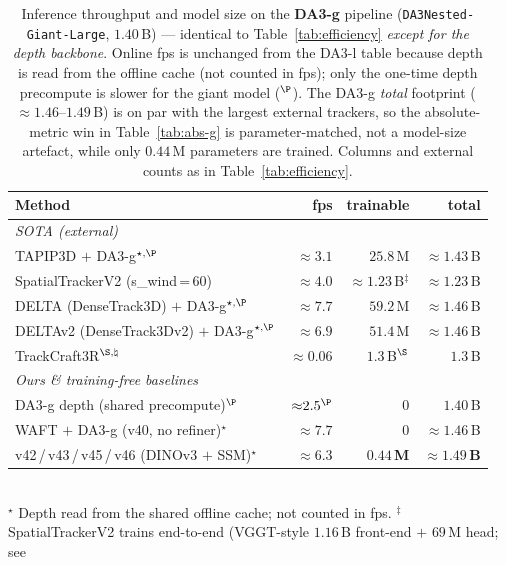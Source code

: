 \documentclass[11pt,a4paper]{article}
\begin{document}
\begin{table}[h]
\centering
\caption{Inference throughput and model size on the \textbf{DA3-g} pipeline
         (\texttt{DA3Nested-Giant-Large}, $1.40$\,B) --- identical to Table~\ref{tab:efficiency} \emph{except
         for the depth backbone}. Online fps is unchanged from the DA3-l table because depth is read from the
         offline cache (not counted in fps); only the one-time depth precompute is slower for the giant model
         ($^{\P}$). The DA3-g \emph{total} footprint (${\approx}1.46$--$1.49$\,B) is on par with the largest
         external trackers, so the absolute-metric win in Table~\ref{tab:abs-g} is parameter-matched, not a
         model-size artefact, while only $0.44$\,M parameters are trained. Columns and external counts as in
         Table~\ref{tab:efficiency}.}
\label{tab:efficiency-g}
\begin{tabular}{lrrr}
\toprule
Method & fps & trainable & total \\
\midrule
\multicolumn{4}{l}{\emph{SOTA (external)}} \\
TAPIP3D $+$ DA3-g$^{\star,\P}$          & ${\approx}3.1$  & $25.8$\,M & ${\approx}1.43$\,B \\
SpatialTrackerV2 (s\_wind\,=\,60)      & ${\approx}4.0$  & ${\approx}1.23$\,B$^{\ddagger}$ & ${\approx}1.23$\,B \\
DELTA (DenseTrack3D) $+$ DA3-g$^{\star,\P}$ & ${\approx}7.7$  & $59.2$\,M & ${\approx}1.46$\,B \\
DELTAv2 (DenseTrack3Dv2) $+$ DA3-g$^{\star,\P}$ & ${\approx}6.9$  & $51.4$\,M & ${\approx}1.46$\,B \\
TrackCraft3R$^{\S,\natural}$           & ${\approx}0.06$ & $1.3$\,B$^{\S}$ & $1.3$\,B \\
\midrule
\multicolumn{4}{l}{\emph{Ours \& training-free baselines}} \\
DA3-g depth (shared precompute)$^{\P}$   & ${\approx}2.5^{\P}$ & 0 & $1.40$\,B \\
WAFT $+$ DA3-g (v40, no refiner)$^{\star}$      & ${\approx}7.7$      & 0 & ${\approx}1.46$\,B \\
v42\,/\,v43\,/\,v45\,/\,v46 (DINOv3 $+$ SSM)$^{\star}$ & ${\approx}6.3$ & $\mathbf{0.44}$\,\textbf{M} & ${\approx}\mathbf{1.49}$\,\textbf{B} \\
\bottomrule
\end{tabular}
\\[2pt]
{\footnotesize
$^{\star}$ Depth read from the shared offline cache; not counted in fps.
$^{\ddagger}$ SpatialTrackerV2 trains end-to-end (VGGT-style $1.16$\,B front-end $+$ $69$\,M head; see
}
\end{table}
\end{document}
